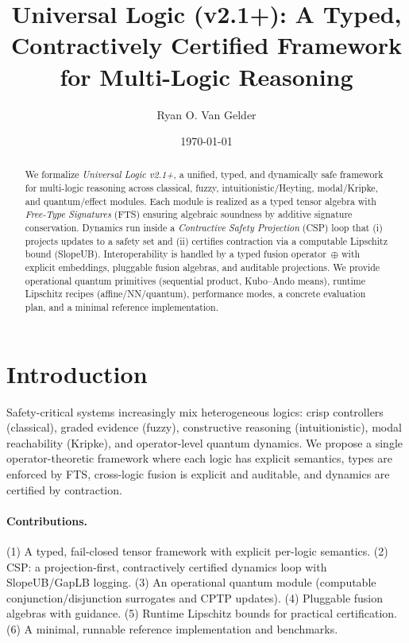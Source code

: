 \documentclass[11pt]{article}
\title{Universal Logic (v2.1+): A Typed, Contractively Certified Framework for Multi-Logic Reasoning}
\author{Ryan O. Van Gelder}
\date{\today}
\begin{document}
\maketitle

\begin{abstract}
We formalize \emph{Universal Logic v2.1+}, a unified, typed, and dynamically safe framework for multi-logic reasoning across classical, fuzzy, intuitionistic/Heyting, modal/Kripke, and quantum/effect modules. Each module is realized as a typed tensor algebra with \emph{Free-Type Signatures} (FTS) ensuring algebraic soundness by additive signature conservation. Dynamics run inside a \emph{Contractive Safety Projection} (CSP) loop that (i) projects updates to a safety set and (ii) certifies contraction via a computable Lipschitz bound (\textsf{SlopeUB}). Interoperability is handled by a typed fusion operator~$\oplus$ with explicit embeddings, pluggable fusion algebras, and auditable projections. We provide operational quantum primitives (sequential product, Kubo--Ando means), runtime Lipschitz recipes (affine/NN/quantum), performance modes, a concrete evaluation plan, and a minimal reference implementation.
\end{abstract}

\tableofcontents

\section{Introduction}
Safety-critical systems increasingly mix heterogeneous logics: crisp controllers (classical), graded evidence (fuzzy), constructive reasoning (intuitionistic), modal reachability (Kripke), and operator-level quantum dynamics. We propose a single operator-theoretic framework where each logic has explicit semantics, types are enforced by FTS, cross-logic fusion is explicit and auditable, and dynamics are certified by contraction.

\paragraph{Contributions.}
(1) A typed, fail-closed tensor framework with explicit per-logic semantics. (2) CSP: a projection-first, contractively certified dynamics loop with \textsf{SlopeUB}/\textsf{GapLB} logging. (3) An operational quantum module (computable conjunction/disjunction surrogates and CPTP updates). (4) Pluggable fusion algebras with guidance. (5) Runtime Lipschitz bounds for practical certification. (6) A minimal, runnable reference implementation and benchmarks.
\end{document}
